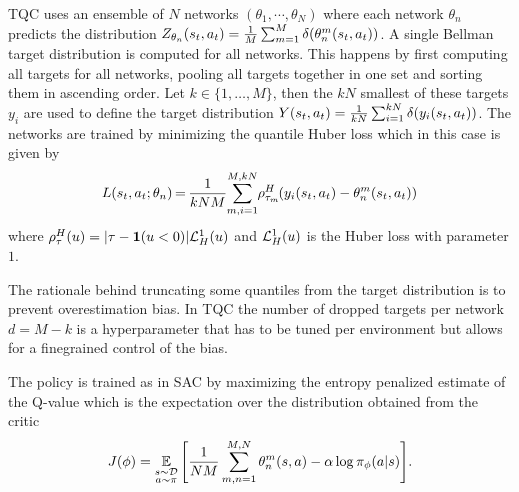 TQC uses an ensemble of $N$ networks $(\theta_1, \cdots, \theta_N)$  where each network $\theta_n$ predicts the distribution 
$Z_{\theta_n} (s_t,a_t) = \frac{1}{M} \sum_{m=1}^{M} \delta ( \theta_n^m(s_t,a_t))$.
A single Bellman target distribution is computed for all networks. This happens by first computing all targets for all networks, pooling all targets together in one set and sorting them in ascending order. 
Let $k \in \{1, \dots, M\}$, then the $kN$ smallest of these targets $y_i$ are used to define the target distribution
$Y(s_t, a_t) = \frac{1}{kN} \sum_{i=1}^{kN} \delta ( y_i (s_t,a_t))$.
The networks are trained by minimizing the quantile Huber loss which in this case is given by
\vspace{-0.2cm}
\begin{equation}
    L(\stt,\at; \theta_n) \hspace{-1pt} = \hspace{-1pt} \frac{1}{kNM} \hspace{-2pt} \sum_{m,i=1}^{M, kN} \hspace{-2pt} \rho^H_{\tau_m} \hspace{-1pt} (y_i(\stt,\at)  -  \theta^m_n (\stt,\at))
    \vspace{-0.2cm}
\end{equation}
where $\rho^H_{\tau} (u) = |\tau -  \mathbf{1}(u < 0) | \mathcal{L}_H^1(u)$ and $\mathcal{L}_H^1(u)$ is the Huber loss with parameter $1$.


The rationale behind truncating some quantiles from the target distribution is to prevent overestimation bias. 
In TQC the number of dropped targets per network $d = M- k$ is a hyperparameter that has to be tuned per environment but allows for a finegrained control of the bias. 



The policy is trained as in SAC by maximizing the entropy penalized estimate of the Q-value which is the expectation over the distribution obtained from the critic
\begin{equation}
J(\phi) = \operatorname*{\mathbb{E}}_{\substack{s\sim\mathcal{D}\\ a\sim\pi}} \Bigg[ \frac{1}{NM} \sum_{m,n=1}^{M,N} \theta_n^m (s,a)  - \alpha \log \pi_\phi(a|s)   \Bigg]   .
\end{equation}

